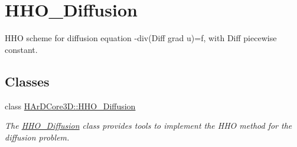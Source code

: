 \hypertarget{group__HHO__Diffusion}{}\section{H\+H\+O\+\_\+\+Diffusion}
\label{group__HHO__Diffusion}


H\+HO scheme for diffusion equation -\/div(Diff grad u)=f, with Diff piecewise constant.  


\subsection*{Classes}
\begin{DoxyCompactItemize}
\item 
class \hyperlink{classHArDCore3D_1_1HHO__Diffusion}{H\+Ar\+D\+Core3\+D\+::\+H\+H\+O\+\_\+\+Diffusion}
\begin{DoxyCompactList}\small\item\em The \hyperlink{classHArDCore3D_1_1HHO__Diffusion}{H\+H\+O\+\_\+\+Diffusion} class provides tools to implement the H\+HO method for the diffusion problem. \end{DoxyCompactList}\end{DoxyCompactItemize}
